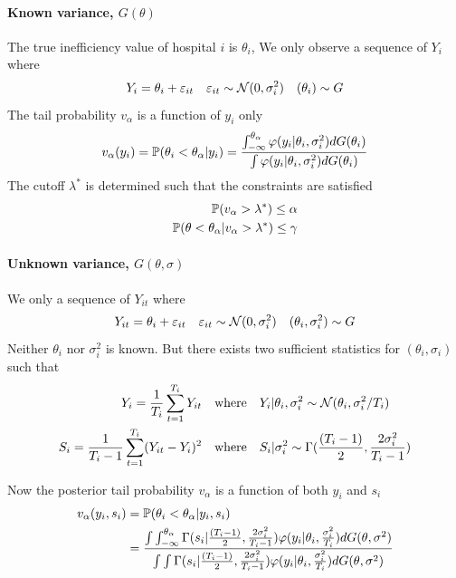 \documentclass[12pt]{article}
\begin{document}
\paragraph{Known variance, $G(\theta)$}
The true inefficiency value of hospital $i$ is $\theta_i$, We only observe a
sequence of $Y_{i}$ where
\begin{equation*}
    Y_{i} = \theta_i + \varepsilon_{it} \quad \varepsilon_{it} \sim \mathcal{N}(0,\sigma_i^2) \quad (\theta_i) \sim G
\end{equation*}
The tail probability $v_\alpha$ is a function of $y_i$ only
\begin{equation*}
    v_\alpha(y_i) =\mathbb{P}(\theta_i<\theta_\alpha|y_i) =\frac{\int_{-\infty}^{\theta_\alpha} \varphi(y_i|\theta_i,\sigma_i^2)dG(\theta_i)}{\int \varphi(y_i|\theta_i,\sigma_i^2)dG(\theta_i)}
\end{equation*}
The cutoff $\lambda^*$ is determined such that the constraints are satisfied
\begin{align*}
    \mathbb{P}(v_\alpha>\lambda^*) \le \alpha \\
    \mathbb{P}(\theta<\theta_\alpha|v_\alpha>\lambda^*) \le \gamma
\end{align*}

\paragraph{Unknown variance, $G(\theta,\sigma)$}
We only a sequence of $Y_{it}$ where
\begin{equation*}
    Y_{it} = \theta_i + \varepsilon_{it} \quad \varepsilon_{it} \sim \mathcal{N}(0,\sigma_i^2) \quad (\theta_i,\sigma_i^2) \sim G
\end{equation*}
Neither $\theta_i$ nor $\sigma_i^2$ is known. But there exists two sufficient statistics for $(\theta_i,\sigma_i)$ such that
\begin{align*}
    Y_i=\frac{1}{T_i}\sum_{t=1}^{T_i}Y_{it}           & \quad \text{where}\quad Y_i|\theta_i,\sigma_i^2 \sim \mathcal{N}(\theta_i,\sigma_i^2/T_i)              \\
    S_i=\frac{1}{T_i-1}\sum_{t=1}^{T_i}(Y_{it}-Y_i)^2 & \quad \text{where} \quad S_i|\sigma_i^2 \sim \Gamma(\frac{(T_i-1)}{2},\frac{2\sigma_i^2}{T_i-1})
\end{align*}

Now the posterior tail probability $v_\alpha$ is a function of both $y_i$ and
$s_i$
\begin{align*}
    v_\alpha(y_i,s_i) & =\mathbb{P}(\theta_i<\theta_\alpha|y_i,s_i)                                                                                                                                                                                                                                                                \\
                      & =\frac{\int\int_{-\infty}^{\theta_\alpha} \Gamma(s_i|\frac{(T_i-1)}{2},\frac{2\sigma_i^2}{T_i-1})\varphi(y_i|\theta_i,\frac{\sigma_i^2}{T_i})dG(\theta,\sigma^2)}{\int\int \Gamma(s_i|\frac{(T_i-1)}{2},\frac{2\sigma_i^2}{T_i-1})\varphi(y_i|\theta_i,\frac{\sigma_i^2}{T_i})dG(\theta,\sigma^2)} \\
\end{align*}
\end{document}
